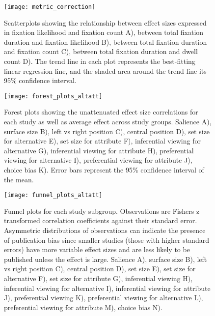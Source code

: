 \documentclass{article}
\begin{document}
\begin{figure}%
\texttt{[image: metric\_correction]}
\centering
\caption{Scatterplots showing the relationship between effect sizes expressed in fixation likelihood and fixation count A), between total fixation duration and fixation likelihood B), between total fixation duration and fixation count C), between total fixation duration and dwell count D). The trend line in each plot represents the best-fitting linear regression line, and the shaded area around the trend line its 95\% confidence interval.}
\label{fig:metric_correction}
\end{figure}
\clearpage



\clearpage



\clearpage


\begin{figure}%
\texttt{[image: forest\_plots\_altatt]}
\centering
\caption{Forest plots showing the unattenuated effect size correlations for each study as well as average effect across study groups. Salience A), surface size B), left vs right position C), central position D), set size for alternative E), set size for attribute F), inferential viewing for alternative G), inferential viewing for attribute H), preferential viewing for alternative I), preferential viewing for attribute J), choice bias K). Error bars represent the 95\% confidence interval of the mean.}
\label{fig:forest_plots_altatt}
\end{figure}
\clearpage


\begin{figure}%
\texttt{[image: funnel\_plots\_altatt]}
\centering
\caption{Funnel plots for each study subgroup. Observations are Fishers z transformed correlation coefficients against their standard error. Asymmetric distributions of observations can indicate the presence of publication bias since smaller studies (those with higher standard errors) have more variable effect sizes and are less likely to be published unless the effect is large. Salience A), surface size B), left vs right position C), central position D), set size E), set size for alternative F), set size for attribute G), inferential viewing H), inferential viewing for alternative I), inferential viewing for attribute J), preferential viewing K), preferential viewing for alternative L), preferential viewing for attribute M), choice bias N).}
\label{fig:funnel_plots_altatt}
\end{figure}
\clearpage
\end{document}
